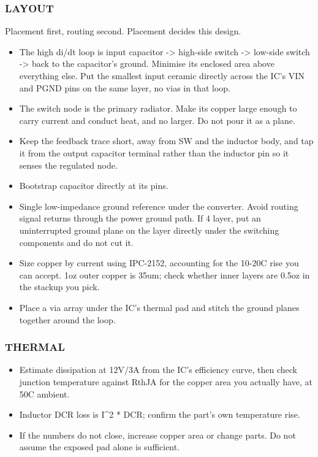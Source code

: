 \documentclass[11pt,a4paper]{article}
\begin{document}
\subsubsection*{LAYOUT}
Placement first, routing second. Placement decides this design.

\begin{itemize}
\item The high di/dt loop is input capacitor -\textgreater{} high-side switch -\textgreater{} low-side switch -\textgreater{}
back to the capacitor's ground. Minimise its enclosed area above everything else.
Put the smallest input ceramic directly across the IC's VIN and PGND pins on the
same layer, no vias in that loop.
\item The switch node is the primary radiator. Make its copper large enough to carry
current and conduct heat, and no larger. Do not pour it as a plane.
\item Keep the feedback trace short, away from SW and the inductor body, and tap it from
the output capacitor terminal rather than the inductor pin so it senses the
regulated node.
\item Bootstrap capacitor directly at its pins.
\item Single low-impedance ground reference under the converter. Avoid routing signal
returns through the power ground path. If 4 layer, put an uninterrupted ground
plane on the layer directly under the switching components and do not cut it.
\item Size copper by current using IPC-2152, accounting for the 10-20C rise you can
accept. 1oz outer copper is 35um; check whether inner layers are 0.5oz in the
stackup you pick.
\item Place a via array under the IC's thermal pad and stitch the ground planes together
around the loop.
\end{itemize}
\subsubsection*{THERMAL}
\begin{itemize}
\item Estimate dissipation at 12V/3A from the IC's efficiency curve, then check junction
temperature against RthJA for the copper area you actually have, at 50C ambient.
\item Inductor DCR loss is I\textasciicircum{}2 {*} DCR; confirm the part's own temperature rise.
\item If the numbers do not close, increase copper area or change parts. Do not assume
the exposed pad alone is sufficient.
\end{itemize}
\end{document}

